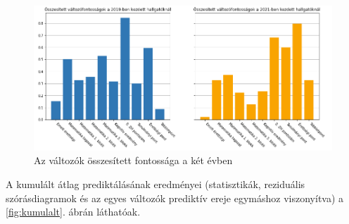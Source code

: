 \documentclass[12pt]{article}
\begin{document}
\begin{figure}[H]
\centering
\includegraphics[scale=0.65]{kepek/eves_valtozok.png}
\caption{Az változók összesített fontossága a két évben}
\label{fig:variables2}
\end{figure}

A kumulált átlag prediktálásának eredményei (statisztikák, reziduális szórásdiagramok és az egyes változók prediktív ereje egymáshoz viszonyítva) a \ref{fig:kumulalt}. ábrán láthatóak. 
\vspace{0.5cm}
\end{document}
